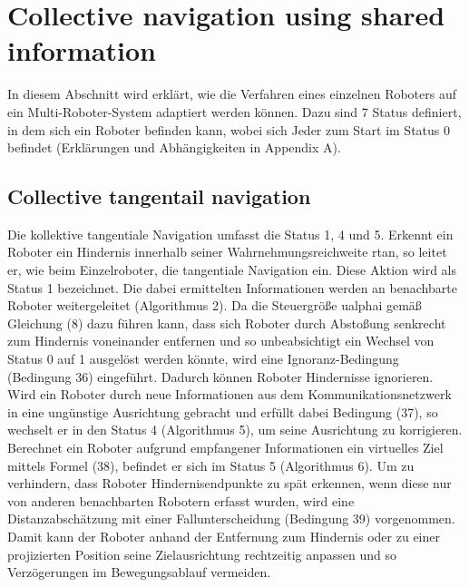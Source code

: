 \documentclass[conference]{IEEEtran}
\begin{document}
\section{Collective navigation using shared information}
In diesem Abschnitt wird erklärt, wie die Verfahren eines einzelnen Roboters auf ein Multi-Roboter-System adaptiert werden können. Dazu sind 7 Status definiert, in dem sich ein Roboter befinden kann, wobei sich Jeder zum Start im Status 0 befindet (Erklärungen und Abhängigkeiten in Appendix A).

\subsection{Collective tangentail navigation}
Die kollektive tangentiale Navigation umfasst die Status 1, 4 und 5. Erkennt ein Roboter ein Hindernis innerhalb seiner Wahrnehmungsreichweite rtan, so leitet er, wie beim Einzelroboter, die tangentiale Navigation ein. Diese Aktion wird als Status 1 bezeichnet. Die dabei ermittelten Informationen werden an benachbarte Roboter weitergeleitet (Algorithmus 2).
Da die Steuergröße ualphai gemäß Gleichung (8) dazu führen kann, dass sich Roboter durch Abstoßung senkrecht zum Hindernis voneinander entfernen und so unbeabsichtigt ein Wechsel von Status 0 auf 1 ausgelöst werden könnte, wird eine Ignoranz-Bedingung (Bedingung 36) eingeführt. Dadurch können Roboter Hindernisse ignorieren.
Wird ein Roboter durch neue Informationen aus dem Kommunikationsnetzwerk in eine ungünstige Ausrichtung gebracht und erfüllt dabei Bedingung (37), so wechselt er in den Status 4 (Algorithmus 5), um seine Ausrichtung zu korrigieren.
Berechnet ein Roboter aufgrund empfangener Informationen ein virtuelles Ziel mittels Formel (38), befindet er sich im Status 5 (Algorithmus 6).
Um zu verhindern, dass Roboter Hindernisendpunkte zu spät erkennen, wenn diese nur von anderen benachbarten Robotern erfasst wurden, wird eine Distanzabschätzung mit einer Fallunterscheidung (Bedingung 39) vorgenommen. Damit kann der Roboter anhand der Entfernung zum Hindernis oder zu einer projizierten Position seine Zielausrichtung rechtzeitig anpassen und so Verzögerungen im Bewegungsablauf vermeiden.
\end{document}
